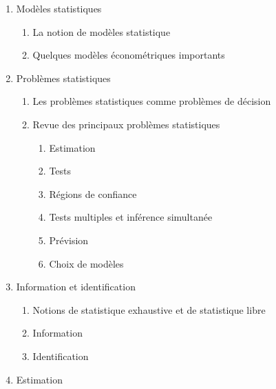 \documentclass[titlepage,11pt,amstex]{article}
\begin{document}
\begin{enumerate}
\item Mod\`{e}les statistiques

\begin{enumerate}
\item La notion de mod\`{e}les statistique

\item Quelques mod\`{e}les \'{e}conom\'{e}triques importants
\end{enumerate}

\item \label{Statistical problems}Probl\`{e}mes statistiques

\begin{enumerate}
\item Les probl\`{e}mes statistiques comme probl\`{e}mes de d\'{e}cision

\item Revue des principaux probl\`{e}mes statistiques

\begin{enumerate}
\item Estimation

\item Tests

\item R\'{e}gions de confiance

\item Tests multiples et inf\'{e}rence simultan\'{e}e

\item Pr\'{e}vision

\item Choix de mod\`{e}les
\end{enumerate}
\end{enumerate}

\item \label{Information and sufficiency}Information et identification

\begin{enumerate}
\item \label{Sufficiency}Notions de statistique exhaustive et de statistique
libre

\item \label{Information}Information

\item \label{Identification}Identification
\end{enumerate}

\item \label{Estimation}Estimation


\end{enumerate}
\end{document}
